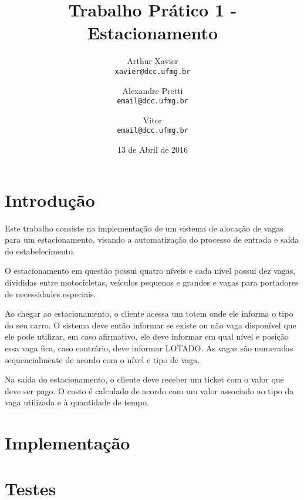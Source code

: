 \documentclass[a4paper,12pt]{article}
\title{Trabalho Prático 1 - Estacionamento}
\author{
    Arthur Xavier\\
    \texttt{xavier@dcc.ufmg.br}
    \and
    Alexandre Pretti\\
    \texttt{email@dcc.ufmg.br}
    \and
    Vitor\\
    \texttt{email@dcc.ufmg.br}
}
\date{13 de Abril de 2016}
\begin{document}
\maketitle

\section{Introdução}

Este trabalho consiste na implementação de um sistema de alocação de vagas para um estacionamento, visando a automatização do processo de entrada e saída do estabelecimento.

O estacionamento em questão possui quatro níveis e cada nível possui dez vagas, divididas entre motocicletas, veículos pequenos e grandes e vagas para portadores de necessidades especiais.

Ao chegar ao estacionamento, o cliente acessa um totem onde ele informa o tipo do seu carro. O sistema deve então informar se existe ou não vaga disponível que ele pode utilizar, em caso afirmativo, ele deve informar em qual nível e posição essa vaga fica, caso contrário, deve informar LOTADO. As vagas são numeradas sequencialmente de acordo com o nível e tipo de vaga.

Na saída do estacionamento, o cliente deve receber um ticket com o valor que deve ser pago. O custo é calculado de acordo com um valor associado ao tipo da vaga utilizada e à quantidade de tempo.

\newpage

\section{Implementação}



\section{Testes}
\end{document}
